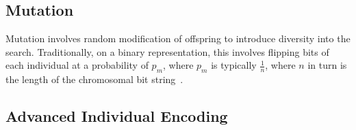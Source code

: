 \documentclass[paper=a4,%
  twoside,%
  BCOR4mm,%
  abstract=true,%
  toc=bibliography,%
  chapterprefix=true,%
  toc=bibliographynumbered,%
  open=right,%
  english,%
  pagesize=pdftex]{scrreprt}
\begin{document}
\subsection{Mutation}
Mutation involves random modification of offspring to introduce diversity into the search. Traditionally, on a binary representation, this involves flipping bits of each individual at a probability of $p_m$, where $p_m$ is typically $\frac{1}{n}$, where $n$ in turn is the length of the chromosomal bit string~\cite{Harman2010a}. 

\subsection{Advanced Individual Encoding}
\end{document}
